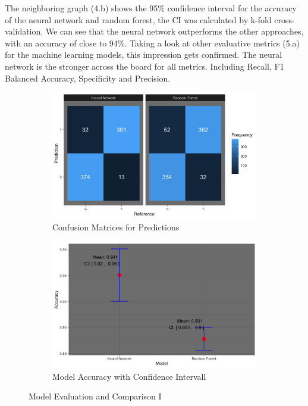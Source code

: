 \documentclass[
]{report}
\begin{document}
The neighboring graph (4.b) shows the 95\% confidence interval for the
accuracy of the neural network and random forest, the CI was calculated
by k-fold cross-validation. We can see that the neural network
outperforms the other approaches, with an accuracy of close to 94\%.
Taking a look at other evaluative metrics (5.a) for the machine learning
models, this impression gets confirmed. The neural network is the
stronger across the board for all metrics. Including Recall, F1 Balanced
Accuracy, Specificity and Precision.

\begin{figure}[h]
    \begin{subfigure}{0.45\textwidth} %
        \centering
        \includegraphics[width=\textwidth]{images/NNRF4.png}
        \caption{Confusion Matrices for Predictions}
        \label{fig:scree_plot}
    \end{subfigure}
    \hfill %
    \begin{subfigure}{0.45\textwidth} %
        \centering
        \includegraphics[width=\textwidth]{images/NNRF2.png}
        \caption{Model Accuracy with Confidence Intervall}
        \label{fig:pca_result}
    \end{subfigure}
    \caption{Model Evaluation and Comparison I}
    \label{fig:pca_combined}
\end{figure}
\end{document}

